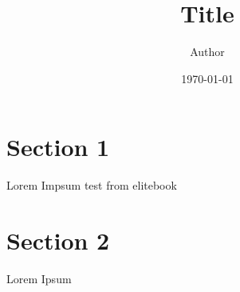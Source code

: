 \documentclass[11pt]{article}
\title{ Title}
\author{ Author }
\date{\today}
\begin{document}
\maketitle	
\pagebreak



\section{Section 1}

Lorem Impsum test from elitebook


\pagebreak
\section{Section 2}
Lorem Ipsum \\

\end{document}
